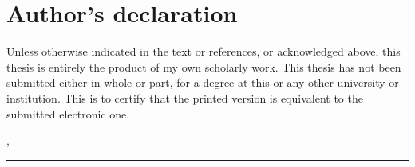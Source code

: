 \thispagestyle{empty}

\section*{Author's declaration}
\vspace*{2em}
Unless otherwise indicated in the text or references, or acknowledged above, this thesis is entirely the product of my own scholarly work. This thesis has not been submitted either in whole or part, for a degree at this or any other university or institution. This is to certify that the printed version is equivalent to the submitted electronic one.
\vspace{3em}

\abgabeort, \datumAbgabe
\vspace{4em}

\rule{6cm}{0.4pt}\\
\autor